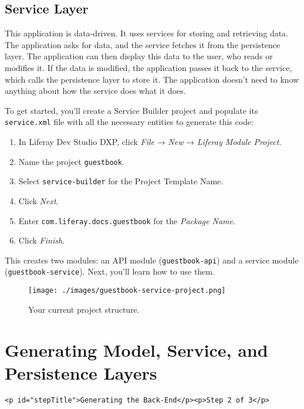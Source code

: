 \section{Service Layer}\label{service-layer}

This application is data-driven. It uses services for storing and
retrieving data. The application asks for data, and the service fetches
it from the persistence layer. The application can then display this
data to the user, who reads or modifies it. If the data is modified, the
application passes it back to the service, which calls the persistence
layer to store it. The application doesn't need to know anything about
how the service does what it does.

To get started, you'll create a Service Builder project and populate its
\texttt{service.xml} file with all the necessary entities to generate
this code:

\begin{enumerate}
\def\labelenumi{\arabic{enumi}.}
\item
  In Liferay Dev Studio DXP, click \emph{File} → \emph{New} →
  \emph{Liferay Module Project}.
\item
  Name the project \texttt{guestbook}.
\item
  Select \texttt{service-builder} for the Project Template Name.
\item
  Click \emph{Next}.
\item
  Enter \texttt{com.liferay.docs.guestbook} for the \emph{Package Name}.
\item
  Click \emph{Finish}.
\end{enumerate}

This creates two modules: an API module (\texttt{guestbook-api}) and a
service module (\texttt{guestbook-service}). Next, you'll learn how to
use them.

\begin{figure}
\centering
\texttt{[image: ./images/guestbook-service-project.png]}
\caption{Your current project structure.}
\end{figure}

\chapter{Generating Model, Service, and Persistence
Layers}\label{generating-model-service-and-persistence-layers}

\begin{verbatim}
<p id="stepTitle">Generating the Back-End</p><p>Step 2 of 3</p>
\end{verbatim}

